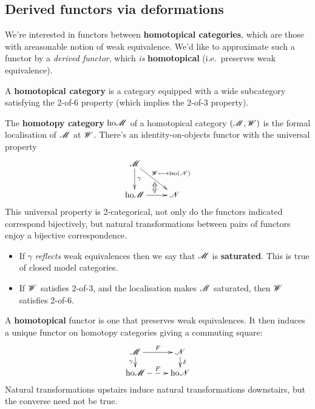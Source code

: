 \documentclass[11pt]{article}
\begin{document}
\begin{3. Derived functors via deformations}
\section*{Derived functors via deformations}
\begin{itemise}
\setlength{\parindent}{.25in}
\item We're interested in functors between \textbf{homotopical categories}, which are those with areasonable notion of weak equivalence. We'd like to approximate such a functor by a \emph{derived functor}, which \emph{is} \textbf{homotopical} (i.e.\ preserves weak equivalence).
\item A \textbf{homotopical category} is a category equipped with a wide subcategory satisfying the 2-of-6 property (which implies the 2-of-3 property).
\item The \textbf{homotopy category} $\textup{ho}\mathscr{M}$ of a homotopical category $(\mathscr{M},\mathscr{W})$ is the formal localisation of $\mathscr{M}$ at $\mathscr{W}$. There's an identity-on-objects functor \smash{$\scrM\overset{\gamma}{\to}\ho\scrM$} with the universal property
\[\xymatrix{
\scrM
\ar[d]^-{\gamma}
\ar[dr]^-{\scrW\mapsto\textup{iso}(\scrN)}_{}="top"
&%
\\%
\ho\scrM
\ar[r]^{}="bottom"
&%
\scrN%
\ar@{<=>}"top";"bottom"
}\]
This universal property is 2-categorical, not only do the functors indicated correspond bijectively, but natural transformations between pairs of functors enjoy a bijective correspondence.
\item 
\begin{itemize}\squishlist
\setlength{\parindent}{.25in}
\item If $\gamma$ \emph{reflects} weak equivalences then we say that $\mathscr{M}$ is \textbf{saturated}. This is true of closed model categories.
\item If $\mathscr{W}$ satisfies 2-of-3, and the localisation makes $\mathscr{M}$ saturated, then $\mathscr{W}$ satisfies 2-of-6.
\end{itemize}
\item A \textbf{homotopical} functor is one that preserves weak equivalences. It then induces a unique functor on homotopy categories giving a commuting square:
\[\xymatrix@R=4mm{
\scrM
\ar[r]^-{F}
\ar[d]_-{\gamma}
&%
\scrN
\ar[d]^-{\delta}
\\%
\ho\scrM
\ar@{-->}[r]^-{F}
&%
\ho\scrN%
}\]
Natural transformations upstairs induce natural transformations downstairs, but the converse need not be true.

\end{itemise}
\end{3. Derived functors via deformations}
\end{document}

